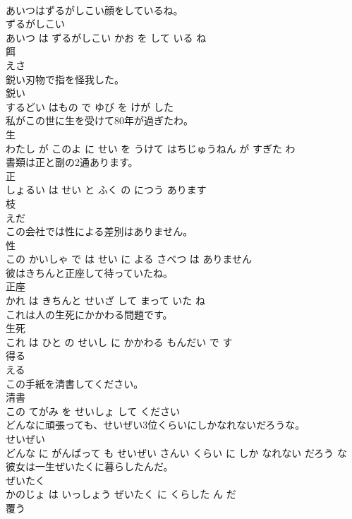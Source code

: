 \documentclass[8pt]{extreport}
\begin{document}
\begin{CJK}{UTF8}{min}
\\	あいつはずるがしこい顔をしているね。	
\\	ずるがしこい 
\\	あいつ は ずるがしこい かお を して いる ね			
\\	餌	
\\	えさ		
\\	鋭い刃物で指を怪我した。	
\\	鋭い 
\\	するどい はもの で ゆび を けが した			
\\	私がこの世に生を受けて80年が過ぎたわ。	
\\	生 
\\	わたし が このよ に せい を うけて はちじゅうねん が すぎた わ			
\\	書類は正と副の2通あります。	
\\	正 
\\	しょるい は せい と ふく の につう あります			
\\	枝	
\\	えだ		
\\	この会社では性による差別はありません。	
\\	性 
\\	この かいしゃ で は せい に よる さべつ は ありません			
\\	彼はきちんと正座して待っていたね。	
\\	正座 
\\	かれ は きちんと せいざ して まって いた ね			
\\	これは人の生死にかかわる問題です。	
\\	生死 
\\	これ は ひと の せいし に かかわる もんだい で す			
\\	得る	
\\	える		
\\	この手紙を清書してください。	
\\	清書 
\\	この てがみ を せいしょ して ください			
\\	どんなに頑張っても、せいぜい3位くらいにしかなれないだろうな。	
\\	せいぜい 
\\	どんな に がんばって も せいぜい さんい くらい に しか なれない だろう な			
\\	彼女は一生ぜいたくに暮らしたんだ。	
\\	ぜいたく 
\\	かのじょ は いっしょう ぜいたく に くらした ん だ			
\\	覆う	

\end{CJK}
\end{document}
